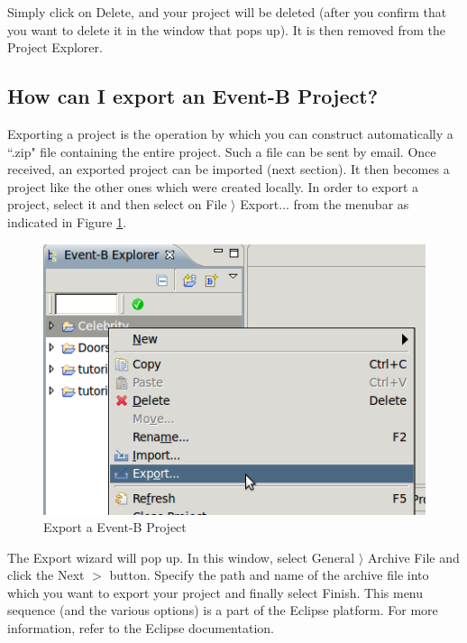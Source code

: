 Simply click on \textsf{Delete}, and your project will be deleted (after you confirm that you want to delete it in the window that pops up). It is then removed from the \textsf{Project Explorer}.

\subsection{How can I export an Event-B Project?}

Exporting a project is the operation by which you can construct automatically a ``.zip" file containing the entire project. Such a file can be sent by email. Once received, an exported project can be imported (next section). It then becomes a project like the other ones which were created locally. In order to export a project, select it and then select on \textsf{File $\rangle$ Export...} from the menubar as indicated in Figure \ref{fig_faq_exportproject}. 

\begin{figure}[!ht]
\begin{center}
	\includegraphics{img/faq/faq_exportproject.png}
	\caption{Export a Event-B Project}
	\label{fig_faq_exportproject}
\end{center}
\end{figure}

The \textsf{Export} wizard will pop up. In this window, select \textsf{General $\rangle$ Archive File} and click the \textsf{Next $>$} button. Specify the path and name of the archive file into which you want to export your project and finally select \textsf{Finish}. This menu sequence (and the various options) is a part of the Eclipse platform. For more information, refer to the Eclipse documentation. 

